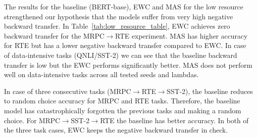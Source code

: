 \documentclass[11pt,a4paper]{article}
\begin{document}


The results for the baseline (BERT-base), EWC and MAS for the low resource strengthened our hypothesis that the models suffer from very high negative backward transfer. In Table~\ref{tab:low_resource_table}, EWC achieves zero backward transfer for the MRPC$\rightarrow$RTE experiment. MAS has higher accuracy for RTE but has a lower negative backward transfer compared to EWC. In case of data-intensive tasks (QNLI/SST-2) we can see that the baseline backward transfer is low but the EWC performs significantly better. MAS does not perform well on data-intensive tasks  across all tested seeds and lambdas. 

In case of three consecutive tasks (MRPC$\rightarrow$RTE$\rightarrow$SST-2), the baseline reduces to random choice accuracy for MRPC and RTE tasks. Therefore, the baseline model has catastrophically forgotten the previous tasks and making a random choice. For MRPC$\rightarrow$SST-2$\rightarrow$RTE the baseline has better accuracy. In both of the three task cases, EWC keeps the negative backward transfer in check.







\end{document}
